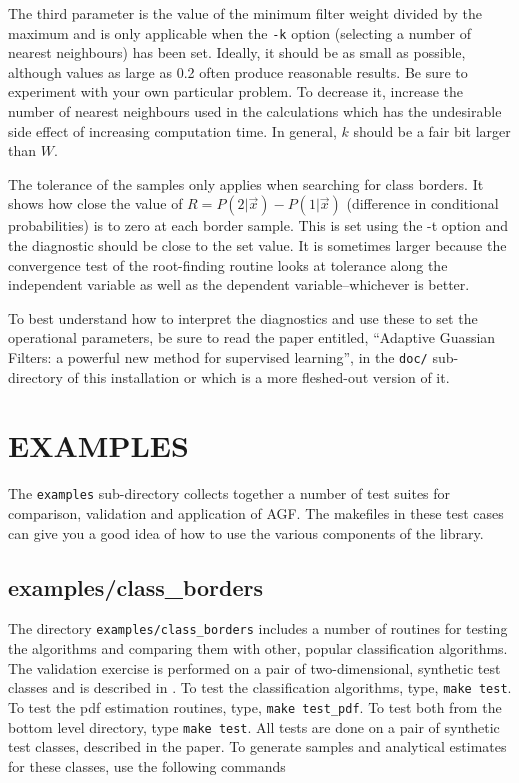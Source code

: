 \documentclass[12pt]{article}
\begin{document}
  The third parameter is the value of the minimum filter weight divided by the maximum and is only applicable when the \verb/-k/ option (selecting a number of nearest neighbours) has been set.  Ideally, it should be as small as possible, although values as large as 0.2 often produce reasonable results.  Be sure to experiment with your own particular problem.  To decrease it, increase the number of nearest neighbours used in the calculations which has the undesirable side effect of increasing computation time.  In general, $k$ should be a fair bit larger than $W$.

  The tolerance of the samples only applies when searching for class borders.  It shows how close the value of $R=P(2|\vec x)-P(1|\vec x)$ (difference in conditional probabilities) is to zero at each border sample.  This is set using the -t option and the diagnostic should be close to the set value.  It is sometimes larger because the convergence test of the root-finding routine looks at tolerance along the independent variable as well as the dependent variable--whichever is better.

  To best understand how to interpret the diagnostics and use these to set the operational parameters, be sure to read the paper entitled, ``Adaptive Guassian Filters: a powerful new method for supervised learning'', in the \verb|doc/| sub-directory of this installation or \citet{Mills2011} which is a more fleshed-out version of it.


\section{EXAMPLES}

\label{EXAMPLES}

  The \verb"examples" sub-directory collects together a number of test suites for comparison, validation and application of AGF.  The makefiles in these test cases can give you a good idea of how to use the various components of the library.

\subsection{examples/class\_borders}

The directory \verb"examples/class_borders" includes a number of routines for testing the algorithms and comparing them with other, popular classification algorithms.  The validation exercise is performed on a pair of two-dimensional, synthetic test classes and is described in \citet{Mills2011}.  To test the classification algorithms, type, \verb"make test".  To test the pdf estimation routines, type, \verb"make test_pdf".  To test both from the bottom level directory, type \verb"make test".  All tests are done on a pair of synthetic test classes, described in the paper.  To generate samples and analytical estimates for these classes, use the following commands
\end{document}
